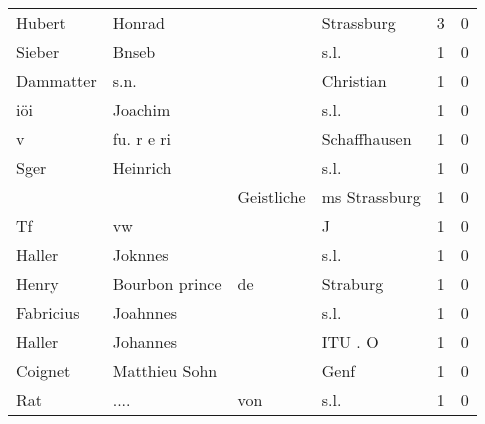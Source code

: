 \documentclass[10pt,a4paper,landscape]{article}
\begin{document}
\begin{longtable}{llllrr}
                   Hubert &                             Honrad &             &                                  Strassburg &          3 &         0 \\
                   Sieber &                              Bnseb &             &                                        s.l. &          1 &         0 \\
                Dammatter &                               s.n. &             &                                   Christian &          1 &         0 \\
                      iöi &                            Joachim &             &                                        s.l. &          1 &         0 \\
                        v &                         fu. r e ri &             &                                Schaffhausen &          1 &         0 \\
                     Sger &                           Heinrich &             &                                        s.l. &          1 &         0 \\
                          &                                    &  Geistliche &                               ms Strassburg &          1 &         0 \\
                       Tf &                                 vw &             &                                           J &          1 &         0 \\
                   Haller &                            Joknnes &             &                                        s.l. &          1 &         0 \\
                    Henry &                     Bourbon prince &          de &                                    Straburg &          1 &         0 \\
                Fabricius &                           Joahnnes &             &                                        s.l. &          1 &         0 \\
                   Haller &                           Johannes &             &                                     ITU . O &          1 &         0 \\
                  Coignet &                      Matthieu Sohn &             &                                        Genf &          1 &         0 \\
                      Rat &                               .... &         von &                                        s.l. &          1 &         0 \\

\end{longtable}
\end{document}
